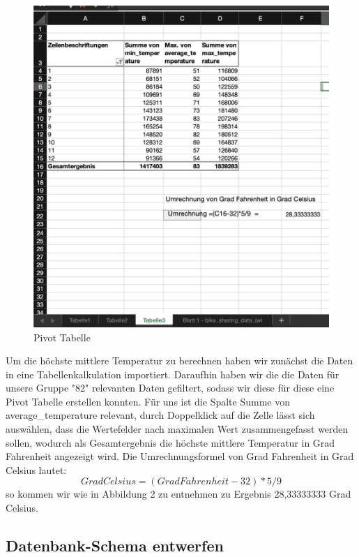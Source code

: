 \documentclass{article}
\begin{document}
\begin{figure}[ht]
\begin{minipage}{0.45\textwidth}
        \includegraphics[width=\textwidth]{Pivot_Tabelle.png}
        \caption{Pivot Tabelle}
        \label{fig:bild2}
    \end{minipage}
   
\end{figure}




Um die höchste mittlere Temperatur zu berechnen haben wir zunächst die Daten in eine Tabellenkalkulation importiert. Daraufhin haben wir die die Daten für unsere Gruppe "82" relevanten Daten  gefiltert, sodass wir diese für diese eine Pivot Tabelle erstellen konnten. Für uns ist die Spalte Summe von average\_temperature relevant, durch Doppelklick auf die Zelle lässt sich auswählen, dass die Wertefelder nach maximalen Wert zusammengefasst werden sollen, wodurch als Gesamtergebnis die höchste mittlere Temperatur in Grad Fahrenheit angezeigt wird. Die Umrechnungsformel von Grad Fahrenheit in Grad Celsius lautet: $$Grad Celsius= (Grad Fahrenheit -32)*5/9$$ so kommen wir wie in Abbildung 2 zu entnehmen zu Ergebnis 28,33333333 Grad Celsius.

 
 \subsection{Datenbank-Schema entwerfen}
\end{document}
